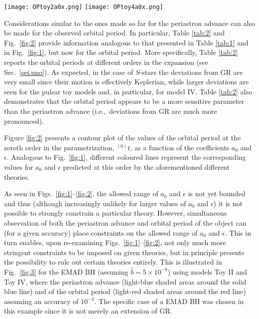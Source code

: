 \documentclass[a4paper,aps,twocolumn,showpacs,showkeys,nofootinbib,preprintnumbers,superscriptaddress,amsmath,amssymb,amsfonts]{revtex4-1}
\newcommand{\ie}{{i.e.,}~}
\begin{document}
%
%
\begin{figure*}
\texttt{[image: OPtoy2a0x.png]}
\texttt{[image: OPtoy4a0x.png]}
\caption{Contour plot of the orbital period and curves as defined in
  Fig. \ref{fig:1}. \textit{Left panel}: Contour for the toy model
  II. The separation between adjacent contours is $4032$ s. \textit{Right
    panel}: Contour for the toy model IV. The separation between adjacent
  contours is $15$ s.}
\label{fig:2}
\end{figure*} 
Considerations similar to the ones made so far for the periastron advance
can also be made for the observed orbital period.
In particular, Table \ref{tab:2} and Fig.~\ref{fig:2} provide information
analogous to that presented in Table \ref{tab:1} and in
Fig.~\ref{fig:1}, but now for the orbital period. 
More specifically, Table \ref{tab:2} reports the orbital periods at different orders in the
expansion (see Sec.~\ref{sei.uno}). 
As expected, in the case of $S$-stars
the deviations from GR are very small since their motion is
effectively Keplerian, while larger deviations are seen for the pulsar
toy models and, in particular, for model IV. 
Table \ref{tab:2} also
demonstrates that the orbital period appears to be a more sensitive
parameter than the periastron advance 
(\ie deviations from GR are much more pronounced). 

Figure \ref{fig:2} presents a contour plot of
the values of the orbital period at the zeroth order in the
parametrization, ${}^{(0)}t$, as a function of the coefficients $a_0$ and
$\epsilon$. 
Analogous to Fig.~\ref{fig:1}, different coloured lines represent the
corresponding values for $a_0$ and $\epsilon$ predicted at this order by
the aforementioned different theories.

As seen in Figs.~\ref{fig:1}--\ref{fig:2}, the allowed range of $a_{0}$ and $\epsilon$
is not yet bounded and thus (although increasingly unlikely for larger values of
$a_{0}$ and $\epsilon$) it is not possible to strongly constrain a particular theory.
However, simultaneous observation of both the periastron advance and orbital period 
of the object can (for a given accuracy) place constraints on the allowed range of
$a_{0}$ and $\epsilon$.
This in turn enables, upon re-examining Figs.~\ref{fig:1}--\ref{fig:2}, not only
much more stringent constraints to be imposed on given theories, but in
principle presents the possibility to rule out certain theories entirely.
This is illustrated in Fig.~\ref{fig:3} for the EMAD BH 
(assuming $\hat{b}=5 \times 10^{-8}$) using models Toy II 
and Toy IV, where the periastron advance (light-blue shaded areas around 
the solid blue line) and of the orbital period (light-red shaded areas around
the red line) assuming an accuracy of $10^{-4}$.
The specific case of a EMAD BH was chosen in this example since it is not
merely an extension of GR.
\end{document}
